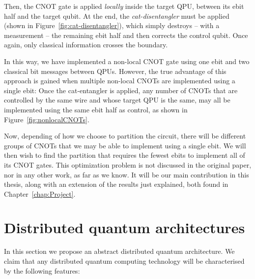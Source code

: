 

Then, the CNOT gate is applied \textit{locally} inside the target QPU, between its ebit half and the target qubit. At the end, the \textit{cat-disentangler} must be applied (shown in Figure~\ref{fig:cat-disentangler}), which simply destroys -- with a measurement -- the remaining ebit half and then corrects the control qubit. Once again, only classical information crosses the boundary.



In this way, we have implemented a non-local CNOT gate using one ebit and two classical bit messages between QPUs. However, the true advantage of this approach is gained when multiple non-local CNOTs are implemented using a single ebit: Once the cat-entangler is applied, any number of CNOTs that are controlled by the same wire and whose target QPU is the same, may all be implemented using the same ebit half as control, as shown in Figure~\ref{fig:nonlocalCNOTs}.



Now, depending of how we choose to partition the circuit, there will be different groups of CNOTs that we may be able to implement using a single ebit. We will then wish to find the partition that requires the fewest ebits to implement all of its CNOT gates. This optimization problem is not discussed in the original paper, nor in any other work, as far as we know. It will be our main contribution in this thesis, along with an extension of the results just explained, both found in Chapter~\ref{chap:Project}.


\section{Distributed quantum architectures}
\label{DQC_Architecture} 

In this section we propose an abstract distributed quantum architecture. We claim that any distributed quantum computing technology will be characterised by the following features:

